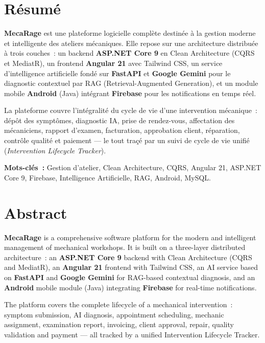 \documentclass[12pt,a4paper]{report}
\begin{document}
\chapter*{Résumé}

\textbf{MecaRage} est une plateforme logicielle complète destinée à la gestion
moderne et intelligente des ateliers mécaniques. Elle repose sur une architecture
distribuée à trois couches~: un backend \textbf{ASP.NET Core 9} en Clean Architecture
(CQRS et MediatR), un frontend \textbf{Angular 21} avec Tailwind CSS, un service
d'intelligence artificielle fondé sur \textbf{FastAPI} et \textbf{Google Gemini}
pour le diagnostic contextuel par RAG (Retrieval-Augmented Generation), et un
module mobile \textbf{Android} (Java) intégrant \textbf{Firebase} pour les
notifications en temps réel.

La plateforme couvre l'intégralité du cycle de vie d'une intervention mécanique~:
dépôt des symptômes, diagnostic IA, prise de rendez-vous, affectation des mécaniciens,
rapport d'examen, facturation, approbation client, réparation, contrôle qualité et
paiement — le tout traçé par un suivi de cycle de vie unifié (\textit{Intervention
Lifecycle Tracker}).

\bigskip
\noindent\textbf{Mots-clés~:} Gestion d'atelier, Clean Architecture, CQRS,
Angular 21, ASP.NET Core 9, Firebase, Intelligence Artificielle, RAG, Android, MySQL.

\chapter*{Abstract}

\textbf{MecaRage} is a comprehensive software platform for the modern and intelligent
management of mechanical workshops. It is built on a three-layer distributed
architecture~: an \textbf{ASP.NET Core 9} backend with Clean Architecture (CQRS and
MediatR), an \textbf{Angular 21} frontend with Tailwind CSS, an AI service based on
\textbf{FastAPI} and \textbf{Google Gemini} for RAG-based contextual diagnosis, and
an \textbf{Android} mobile module (Java) integrating \textbf{Firebase} for real-time
notifications.

The platform covers the complete lifecycle of a mechanical intervention~: symptom
submission, AI diagnosis, appointment scheduling, mechanic assignment, examination
report, invoicing, client approval, repair, quality validation and payment — all
tracked by a unified Intervention Lifecycle Tracker.
\end{document}
